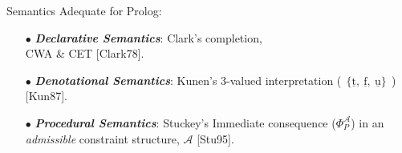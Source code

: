 \documentclass[pdf,slideColor,contemporain]{prosper}
\newcommand{\true}{\underline{\mathrm{t}}}
\newcommand{\false}{\underline{\mathrm{f}}}
\newcommand{\undef}{\underline{\mathrm{u}}}
\begin{document}
\begin{slide}{Semantics}
  \vspace{0.5cm}
Adequate for Prolog:
\begin{itemize} 

     \item[{\blue $\bullet$}] \emph{\bf Declarative Semantics}: {\blue
      Clark}'s completion, \\ CWA \& CET [Clark78].

     \item[{\blue $\bullet$}] \emph{\bf Denotational Semantics}:
     {\blue Kunen}'s 3-valued interpretation ($~~\{\true, ~ \false,~
     \undef \}~~$) [Kun87].
 
     \item[{\blue $\bullet$}] \emph{\bf Procedural Semantics}: {\blue
     Stuckey}'s Immediate consequence ($\Phi_P^\mathcal{A}$) in an
     \emph{admissible} constraint structure, $\mathcal{A}$ [Stu95].



\end{itemize}
\end{slide}
\end{document}

